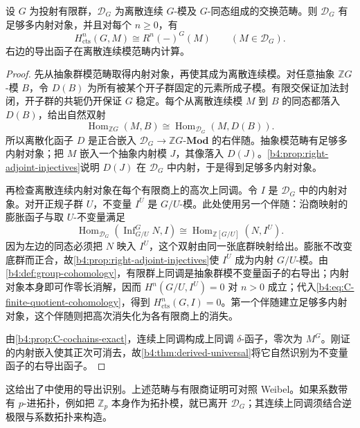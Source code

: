 \begin{theorem}\label{b4:thm:C-continuous-derived}
	设 \(G\) 为投射有限群，\(\mathcal D_G\) 为离散连续 \(G\)-模及 \(G\)-同态组成的交换范畴。则 \(\mathcal D_G\) 有足够多内射对象，并且对每个 \(n\ge0\)，有
	\[
		H^n_{\mathrm{cts}}(G,M)\cong R^n(-)^G(M) \qquad(M\in\mathcal D_G).
	\]
	右边的导出函子在离散连续模范畴内计算。
\end{theorem}
\begin{proof}
	先从抽象群模范畴取得内射对象，再使其成为离散连续模。对任意抽象 \(\mathbb ZG\)-模 \(B\)，令 \(D(B)\) 为所有被某个开子群固定的元素所成子模。有限交保证加法封闭，开子群的共轭仍开保证 \(G\) 稳定。每个从离散连续模 \(M\) 到 \(B\) 的同态都落入 \(D(B)\)，给出自然双射
	\[
		\operatorname{Hom}_{\mathbb ZG}(M,B) \cong\operatorname{Hom}_{\mathcal D_G}(M,D(B)).
	\]
	所以离散化函子 \(D\) 是正合嵌入 \(\mathcal D_G\rightarrow\mathbb ZG\text{-}\mathbf{Mod}\) 的右伴随。抽象模范畴有足够多内射对象；把 \(M\) 嵌入一个抽象内射模 \(J\)，其像落入 \(D(J)\)。\cref{b4:prop:right-adjoint-injectives}说明 \(D(J)\) 在 \(\mathcal D_G\) 中内射，于是得到足够多内射对象。

	再检查离散连续内射对象在每个有限商上的高次上同调。令 \(I\) 是 \(\mathcal D_G\) 中的内射对象。对开正规子群 \(U\)，不变量 \(I^U\) 是 \(G/U\)-模。此处使用另一个伴随：沿商映射的膨胀函子与取 \(U\)-不变量满足
	\[
		\operatorname{Hom}_{\mathcal D_G} (\operatorname{Inf}_{G/U}^G N,I) \cong\operatorname{Hom}_{\mathbb Z[G/U]}(N,I^U).
	\]
	因为左边的同态必须把 \(N\) 映入 \(I^U\)，这个双射由同一张底群映射给出。膨胀不改变底群而正合，故\cref{b4:prop:right-adjoint-injectives}使 \(I^U\) 成为内射 \(G/U\)-模。由\cref{b4:def:group-cohomology}，有限群上同调是抽象群模不变量函子的右导出；内射对象本身即可作零长消解，因而 \(H^n(G/U,I^U)=0\) 对 \(n>0\) 成立；代入\eqref{b4:eq:C-finite-quotient-cohomology}，得到 \(H^n_{\mathrm{cts}}(G,I)=0\)。第一个伴随建立足够多内射对象，这个伴随则把高次消失化为各有限商上的消失。

	由\cref{b4:prop:C-cochains-exact}，连续上同调构成上同调 \(\delta\)-函子，零次为 \(M^G\)。刚证的内射嵌入使其正次可消去，故\cref{b4:thm:derived-universal}将它自然识别为不变量函子的右导出函子。
\end{proof}

这给出了中使用的导出识别。上述范畴与有限商证明可对照 Weibel\cite[Definition 6.11.8; Lemma 6.11.10; Theorem 6.11.13, pp. 210--213]{Weibel1994HomologicalAlgebra}。如果系数带有 \(p\)-进拓扑，例如把 \(\mathbb Z_p\) 本身作为拓扑模，就已离开 \(\mathcal D_G\)；其连续上同调须结合逆极限与系数拓扑来构造。

